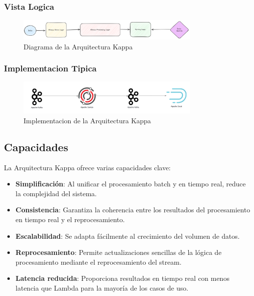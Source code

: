 \newpage
\subsubsection{Vista Logica}
\begin{figure}[h]
\centering
\includegraphics[width=0.8\textwidth]{teorico/kappa.png}
\caption{Diagrama de la Arquitectura Kappa}
\label{fig:arquitectura_kappa}
\end{figure}

\subsubsection{Implementacion Tipica}
\begin{figure}[h]
\centering
\includegraphics[width=0.8\textwidth]{teorico/KappaImplement.png}
\caption{Implementacion de la Arquitectura Kappa}
\label{fig:implementation_arquitectura_kappa}
\end{figure}

\subsection{Capacidades}
La Arquitectura Kappa ofrece varias capacidades clave:
\begin{itemize}
    \item \textbf{Simplificación}: Al unificar el procesamiento batch y en tiempo real, reduce la complejidad del sistema.
    \item \textbf{Consistencia}: Garantiza la coherencia entre los resultados del procesamiento en tiempo real y el reprocesamiento.
    \item \textbf{Escalabilidad}: Se adapta fácilmente al crecimiento del volumen de datos.
    \item \textbf{Reprocesamiento}: Permite actualizaciones sencillas de la lógica de procesamiento mediante el reprocesamiento del stream.
    \item \textbf{Latencia reducida}: Proporciona resultados en tiempo real con menos latencia que Lambda para la mayoría de los casos de uso.
\end{itemize}

